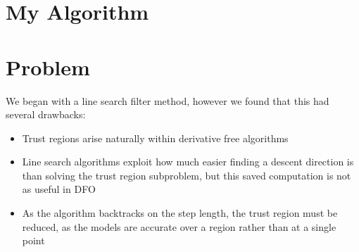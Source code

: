 \documentclass{article} %
\begin{document}
%
%










\section{My Algorithm}

\section{Problem}


We began with a line search filter method, however we found that this had several drawbacks:

\begin{itemize}
\item Trust regions arise naturally within derivative free algorithms
\item Line search algorithms exploit how much easier finding a descent direction is than solving the trust region subproblem, but this saved computation is not as useful in DFO
\item As the algorithm backtracks on the step length, the trust region must be reduced, as the models are accurate over a region rather than at a single point
\end{itemize}
\end{document}
